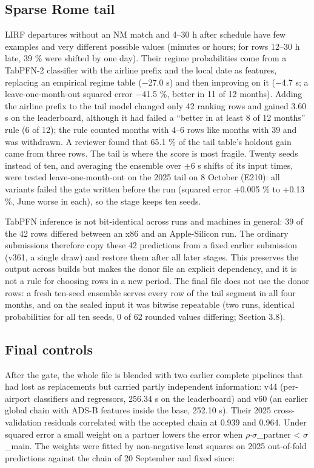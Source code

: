 \documentclass[
  manuscript=article,  %
  layout=preprint,     %
  year=2026,
  volume=4,
]{extra/joas}
\begin{document}
\subsection{Sparse Rome tail}\label{sparse-rome-tail}

LIRF departures without an NM match and 4--30 h after schedule have few examples and very different possible values (minutes or hours; for rows 12--30 h late, 39 \% were shifted by one day). Their regime probabilities come from a TabPFN-2 classifier \autocite{hollmann2025tabpfn} with the airline prefix and the local date as features, replacing an empirical regime table ($-$27.0 s) and then improving on it ($-$4.7 s; a leave-one-month-out squared error $-$41.5 \%, better in 11 of 12 months). Adding the airline prefix to the tail model changed only 42 ranking rows and gained 3.60 s on the leaderboard, although it had failed a ``better in at least 8 of 12 months'' rule (6 of 12); the rule counted months with 4--6 rows like months with 39 and was withdrawn. A reviewer found that 65.1 \% of the tail table's holdout gain came from three rows. The tail is where the score is most fragile. Twenty seeds instead of ten, and averaging the ensemble over $\pm$6 s shifts of its input times, were tested leave-one-month-out on the 2025 tail on 8 October (E210): all variants failed the gate written before the run (squared error +0.005 \% to +0.13 \%, June worse in each), so the stage keeps ten seeds.

TabPFN inference is not bit-identical across runs and machines in general: 39 of the 42 rows differed between an x86 and an Apple-Silicon run. The ordinary submissions therefore copy these 42 predictions from a fixed earlier submission (v361, a single draw) and restore them after all later stages. This preserves the output across builds but makes the donor file an explicit dependency, and it is not a rule for choosing rows in a new period. The final file does not use the donor rows: a fresh ten-seed ensemble serves every row of the tail segment in all four months, and on the sealed input it was bitwise repeatable (two runs, identical probabilities for all ten seeds, 0 of 62 rounded values differing; Section 3.8).

\subsection{Final controls}\label{final-controls}

After the gate, the whole file is blended with two earlier complete pipelines that had lost as replacements but carried partly independent information: v44 (per-airport classifiers and regressors, 256.34 s on the leaderboard) and v60 (an earlier global chain with ADS-B features inside the base, 252.10 s). Their 2025 cross-validation residuals correlated with the accepted chain at 0.939 and 0.964. Under squared error a small weight on a partner lowers the error when $\rho$$\cdot$$\sigma$\_partner \textless{} $\sigma$\_main. The weights were fitted by non-negative least squares on 2025 out-of-fold predictions against the chain of 20 September and fixed since:
\end{document}
